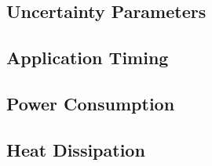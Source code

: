 \subsection{Uncertainty Parameters}


\subsection{Application Timing}


\subsection{Power Consumption}


\subsection{Heat Dissipation}

